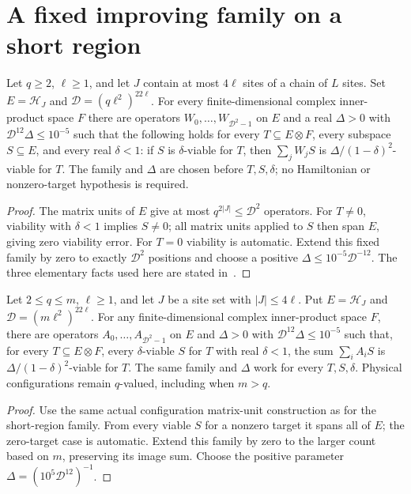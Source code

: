 \section{A fixed improving family on a short region}

\begin{lemma}
    \label{thm:short_actual_region_improving_family}
    \leanok
    Let $q\ge2$, $\ell\ge1$, and let $J$ contain at most $4\ell$ sites
    of a chain of $L$ sites. Set $E=\mathcal H_J$ and
    $\mathcal D=(q\ell^2)^{22\ell}$. For every finite-dimensional complex
    inner-product space $F$ there are operators
    $W_0,\ldots,W_{\mathcal D^2-1}$ on $E$ and a real $\Delta>0$ with
    $\mathcal D^{12}\Delta\le10^{-5}$ such that the following holds for
    every $T\subseteq E\otimes F$, every subspace $S\subseteq E$, and
    every real $\delta<1$: if $S$ is $\delta$-viable for $T$, then
    $\sum_jW_jS$ is $\Delta/(1-\delta)^2$-viable for $T$.
    The family and $\Delta$ are chosen before $T,S,\delta$; no
    Hamiltonian or nonzero-target hypothesis is required.
\end{lemma}
\begin{proof}
    \leanok
    The matrix units of $E$ give at most $q^{2|J|}\le\mathcal D^2$ operators.
    For $T\ne0$, viability with $\delta<1$ implies $S\ne0$; all matrix units
    applied to $S$ then span $E$, giving zero viability error.
    For $T=0$ viability is automatic. Extend this fixed family by zero to
    exactly $\mathcal D^2$ positions and choose a positive
    $\Delta\le10^{-5}\mathcal D^{-12}$. The three elementary facts used here
    are stated in~\cite[``Viable subspaces in coordinates'']{QICLean2026Blueprint}.
\end{proof}

\begin{lemma}
    \label{thm:short_region_larger_count_base}
    \leanok
    Let $2\le q\le m$, $\ell\ge1$, and let $J$ be a site set with
    $|J|\le4\ell$. Put $E=\mathcal H_J$ and
    $\mathcal D=(m\ell^2)^{22\ell}$.
    For any finite-dimensional complex inner-product space $F$, there are
    operators $A_0,\ldots,A_{\mathcal D^2-1}$ on $E$ and $\Delta>0$
    with $\mathcal D^{12}\Delta\le10^{-5}$ such that, for every
    $T\subseteq E\otimes F$, every $\delta$-viable $S$ for $T$ with
    real $\delta<1$, the sum $\sum_iA_iS$ is
    $\Delta/(1-\delta)^2$-viable for $T$.
    The same family and $\Delta$ work for every $T,S,\delta$.
    Physical configurations remain $q$-valued, including when $m>q$.
\end{lemma}
\begin{proof}
    \leanok
    Use the same actual configuration matrix-unit construction as for the
    short-region family. From every viable $S$ for a nonzero target it spans
    all of $E$; the zero-target case is automatic. Extend this family by zero
    to the larger count based on $m$, preserving its image sum. Choose the
    positive parameter $\Delta=(10^5\mathcal D^{12})^{-1}$.
\end{proof}
